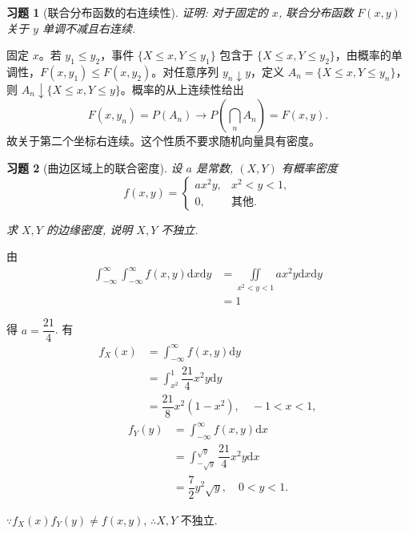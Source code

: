 \documentclass[UTF8,12pt,a4paper,fontset=fandol]{ctexart}
\newtheorem{exercise}{习题}[section]
\begin{document}
\begin{exercise}[联合分布函数的右连续性]\label{q:A4.5}
证明: 对于固定的 $x$, 联合分布函数 $F(x,y)$ 关于 $y$ 单调不减且右连续.\par{}
\end{exercise}

\begin{solve}\label{a:A4.5}固定 $x$。若 $y_1\le y_2$，事件 $\{X\le x,Y\le y_1\}$ 包含于 $\{X\le x,Y\le y_2\}$，由概率的单调性，$F(x,y_1)\le F(x,y_2)$。对任意序列 $y_n\downarrow y$，定义 $A_n=\{X\le x,Y\le y_n\}$，则 $A_n\downarrow\{X\le x,Y\le y\}$。概率的从上连续性给出\[F(x,y_n)=P(A_n)\longrightarrow P\left(\bigcap_nA_n\right)=F(x,y).\]故关于第二个坐标右连续。这个性质不要求随机向量具有密度。\end{solve}

\begin{exercise}[曲边区域上的联合密度]\label{q:A4.11}
设 $a$ 是常数, $(X,Y)$ 有概率密度
    \[f(x,y)=\begin{cases}
        ax^2y, & x^2<y<1, \\
        0, & \text{其他}.
    \end{cases}\]

    求 $X,Y$ 的边缘密度, 说明 $X,Y$ 不独立.\par{}
\end{exercise}

\begin{solve}\label{a:A4.11}
    由
    \[\begin{aligned}\int_{-\infty}^\infty\int_{-\infty}^\infty f(x,y)\mathrm{d}x\mathrm{d}y&=\iint\limits_{x^2<y<1}ax^2y\mathrm{d}x\mathrm{d}y\\&=1\end{aligned}\]

    得 $a=\dfrac{21}{4}$. 有
    \[\begin{aligned}f_X(x)&=\int_{-\infty}^\infty f(x,y)\mathrm{d}y\\&=\int_{x^2}^1\dfrac{21}{4}x^2y\mathrm{d}y\\&=\dfrac{21}{8}x^2(1-x^2),\quad -1<x<1,\end{aligned}\]
    \[\begin{aligned}f_Y(y)&=\int_{-\infty}^\infty f(x,y)\mathrm{d}x\\&=\int_{-\sqrt{y}}^{\sqrt{y}}\dfrac{21}{4}x^2y\mathrm{d}x\\&=\dfrac{7}{2}y^2\sqrt{y},\quad 0<y<1.\end{aligned}\]

    $\because f_X(x)f_Y(y)\neq f(x,y)$, $\therefore X,Y$ 不独立.
\end{solve}
\end{document}
